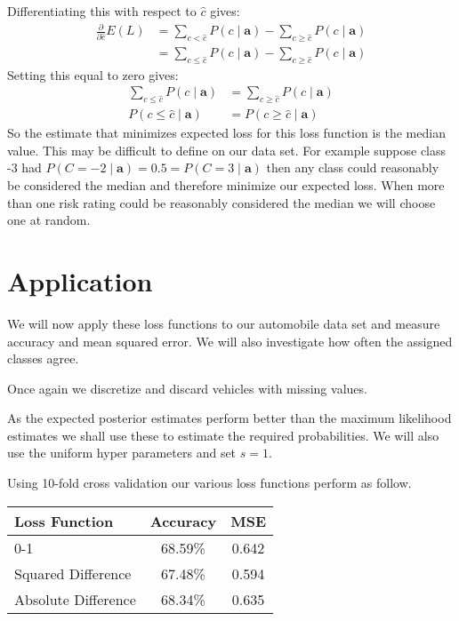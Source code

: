 Differentiating this with respect to $\hat{c}$ gives:
\begin{align}
	\frac{\partial}{\partial \hat{c}} E(L) & = \sum_{c < \hat{c}} P(c \mid \mathbf{a}) - \sum_{c \geq \hat{c}} P(c \mid \mathbf{a}) \\
	& = \sum_{c \leq \hat{c}} P(c \mid \mathbf{a}) - \sum_{c \geq \hat{c}} P(c \mid \mathbf{a})
\end{align}
Setting this equal to zero gives:
\begin{align}
	\sum_{c \leq \hat{c}} P(c \mid \mathbf{a}) & = \sum_{c \geq \hat{c}} P(c \mid \mathbf{a}) \\
	P(c \leq \hat{c} \mid \mathbf{a}) & = P(c \geq \hat{c} \mid \mathbf{a})
\end{align}
So the estimate that minimizes expected loss for this loss function is the median value.
This may be difficult to define on our data set.
For example suppose class -3 had $P(C = -2 \mid \mathbf{a}) = 0.5 = P(C=3 \mid \mathbf{a})$ then any class could reasonably be considered the median and therefore minimize our expected loss.
When more than one risk rating could be reasonably considered the median we will choose one at random.

\section{Application}
We will now apply these loss functions to our automobile data set and measure accuracy and mean squared error.
We will also investigate how often the assigned classes agree.

Once again we discretize and discard vehicles with missing values.

As the expected posterior estimates perform better than the maximum likelihood estimates we shall use these to estimate the required probabilities.
We will also use the uniform hyper parameters and set $s=1$.

Using 10-fold cross validation our various loss functions perform as follow.

\begin{center}
\begin{tabular}{l|c c}
	Loss Function       & Accuracy & MSE   \\
	\hline
	0-1                 & 68.59\%  & 0.642 \\
	Squared Difference  & 67.48\%  & 0.594 \\
	Absolute Difference & 68.34\%  & 0.635 \\
\end{tabular}
\end{center}

